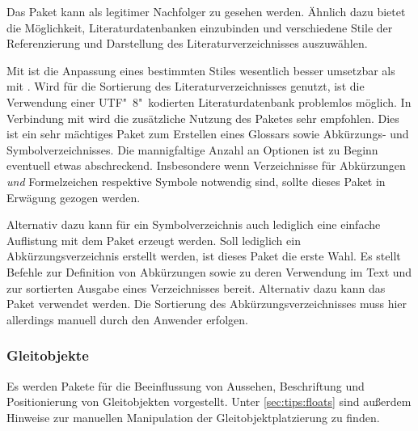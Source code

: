 \begin{DeclarePackages}
  Das Paket kann als legitimer Nachfolger zu  gesehen werden. 
  Ähnlich dazu bietet  die Möglichkeit, Literaturdatenbanken 
  einzubinden und verschiedene Stile der Referenzierung und Darstellung des 
  Literaturverzeichnisses auszuwählen. 
  
  Mit  ist die Anpassung eines bestimmten Stiles wesentlich 
  besser umsetzbar als mit . Wird  für die 
  Sortierung des Literaturverzeichnisses genutzt, ist die Verwendung einer 
  UTF"~8"~kodierten Literaturdatenbank problemlos möglich. In Verbindung mit 
   wird die zusätzliche Nutzung des Paketes 
   sehr empfohlen.
  Dies ist ein sehr mächtiges Paket zum Erstellen eines Glossars sowie 
  Abkürzungs- und Symbolverzeichnisses. Die mannigfaltige Anzahl an Optionen 
  ist zu Beginn eventuell etwas abschreckend. Insbesondere wenn Verzeichnisse 
  für Abkürzungen \emph{und} Formelzeichen respektive Symbole notwendig sind, 
  sollte dieses Paket in Erwägung gezogen werden.
  
  Alternativ dazu kann für ein Symbolverzeichnis auch lediglich eine einfache 
  Auflistung mit dem Paket  erzeugt werden.
  Soll lediglich ein Abkürzungsverzeichnis erstellt werden, ist dieses Paket 
  die erste Wahl. Es stellt Befehle zur Definition von Abkürzungen sowie zu 
  deren Verwendung im Text und zur sortierten Ausgabe eines Verzeichnisses 
  bereit. Alternativ dazu kann das Paket  verwendet werden. 
  Die Sortierung des Abkürzungsverzeichnisses muss hier allerdings manuell 
  durch den Anwender erfolgen.
\end{DeclarePackages}
%



\subsubsection{%
  Gleitobjekte%
}
%
Es werden Pakete für die Beeinflussung von Aussehen, Beschriftung und 
Positionierung von Gleitobjekten vorgestellt. Unter \autoref{sec:tips:floats} 
sind außerdem Hinweise zur manuellen Manipulation der Gleitobjektplatzierung zu 
finden.

